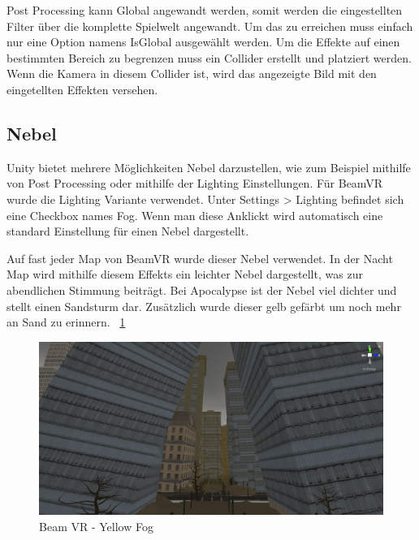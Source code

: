 Post Processing kann Global angewandt werden, somit werden die eingestellten Filter \"uber die komplette Spielwelt angewandt.
Um das zu erreichen muss einfach nur eine Option namens IsGlobal ausgew\"ahlt werden.
Um die Effekte auf einen bestimmten Bereich zu begrenzen muss ein Collider erstellt und platziert werden.
Wenn die Kamera in diesem Collider ist, wird das angezeigte Bild mit den eingetellten Effekten versehen.
~\cite{Unity_Post_Processing_Volumes_2022}


\subsection{Nebel}\label{subsec:fog-effect}
Unity bietet mehrere M\"oglichkeiten Nebel darzustellen, wie zum Beispiel mithilfe von Post Processing oder mithilfe der Lighting Einstellungen.
F\"ur BeamVR wurde die Lighting Variante verwendet.
Unter Settings > Lighting befindet sich eine Checkbox names Fog.
Wenn man diese Anklickt wird automatisch eine standard Einstellung f\"ur einen Nebel dargestellt.
~\cite{Unity_Fog_2022}

Auf fast jeder Map von BeamVR wurde dieser Nebel verwendet.
In der Nacht Map wird mithilfe diesem Effekts ein leichter Nebel dargestellt, was zur abendlichen Stimmung beitr\"agt.
Bei Apocalypse ist der Nebel viel dichter und stellt einen Sandsturm dar. Zus\"atzlich wurde dieser gelb gef\"arbt um noch mehr an Sand zu erinnern.
~\ref{fig:beamvr_yellow_fog}
\begin {figure}
    \centering
    \includegraphics[scale=0.3]{pics/beamvr_yellow_fog}
    \caption{Beam VR - Yellow Fog}
    \label{fig:beamvr_yellow_fog}
\end {figure}

